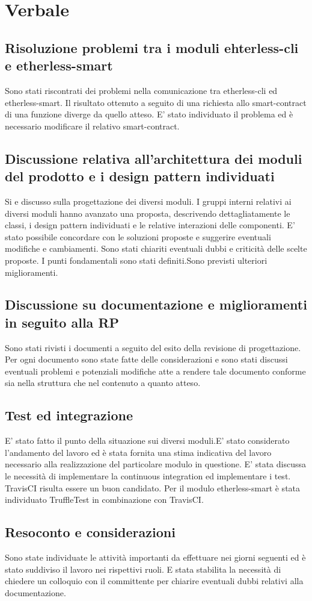 \section{Verbale}
	\subsection{Risoluzione problemi tra i moduli ehterless-cli e etherless-smart}
	 Sono stati riscontrati dei problemi nella comunicazione tra etherless-cli ed etherless-smart. Il risultato ottenuto a seguito di una richiesta allo smart-contract di una funzione diverge da quello atteso. E' stato individuato il problema ed è necessario modificare il relativo smart-contract.
	\subsection{Discussione relativa all'architettura dei moduli del prodotto e i design pattern individuati}
	Si e discusso sulla progettazione dei diversi moduli. I gruppi interni relativi ai diversi moduli hanno avanzato una proposta, descrivendo dettagliatamente le classi, i design pattern individuati e le relative interazioni delle componenti. E' stato possibile concordare con le soluzioni proposte e suggerire eventuali modifiche e cambiamenti. Sono stati chiariti eventuali dubbi e criticità delle scelte proposte. I punti fondamentali sono stati definiti.Sono previsti ulteriori miglioramenti.
	\subsection{Discussione su documentazione e miglioramenti in seguito alla RP}
	Sono stati rivisti i documenti a seguito del esito della revisione di progettazione. Per ogni documento sono state fatte delle considerazioni e sono stati discussi eventuali problemi e potenziali modifiche atte a rendere tale documento conforme sia nella struttura che nel contenuto a quanto atteso.
	\subsection{Test ed integrazione}
	E’ stato fatto il punto della situazione sui diversi moduli.E' stato considerato l’andamento del lavoro ed è stata fornita una stima indicativa del lavoro necessario alla realizzazione del particolare modulo in questione. E’ stata discussa le necessità di implementare la continuous integration ed implementare i test. TravisCI risulta essere un buon candidato. Per il modulo etherless-smart è stata individuato TruffleTest in combinazione con TravisCI.
	\subsection{Resoconto e considerazioni}
	Sono state individuate le attività importanti da effettuare nei giorni seguenti ed è stato suddiviso il lavoro nei rispettivi ruoli. E stata stabilita la necessità di chiedere un colloquio con il committente per chiarire eventuali dubbi relativi alla documentazione.